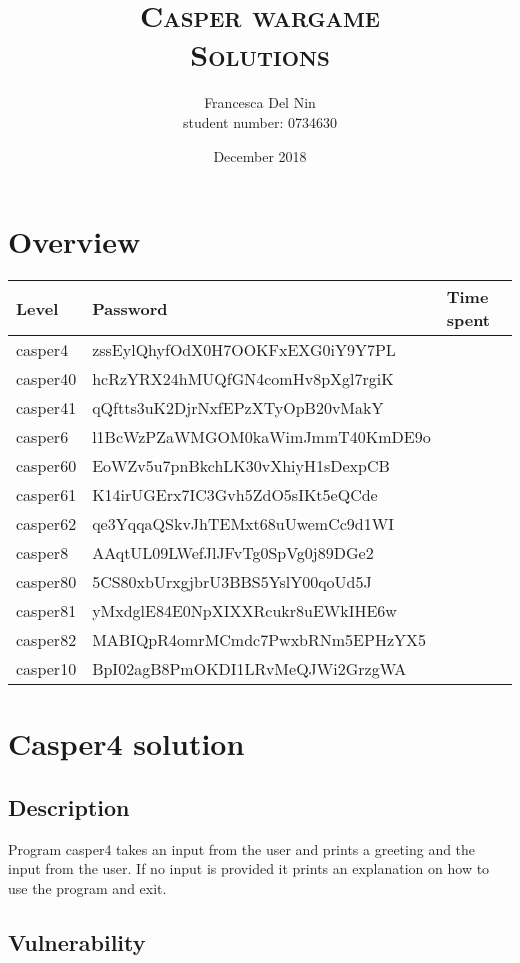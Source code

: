 \documentclass[a4paper,12pt]{article}
\title{\scshape Casper wargame \\ Solutions}
\author{Francesca Del Nin \\ student number: 0734630}
\date{December 2018}
\begin{document}
\maketitle


\section{Overview}
\begin{table}[]
\begin{tabular}{lll}
 Level & Password & Time spent  \\
 \hline
 casper4 & zssEylQhyfOdX0H7OOKFxEXG0iY9Y7PL &   \\
 casper40 & hcRzYRX24hMUQfGN4comHv8pXgl7rgiK & \\
 casper41 & qQftts3uK2DjrNxfEPzXTyOpB20vMakY &   \\
 casper6 & l1BcWzPZaWMGOM0kaWimJmmT40KmDE9o &  \\
 casper60 & EoWZv5u7pnBkchLK30vXhiyH1sDexpCB & \\
 casper61 & K14irUGErx7IC3Gvh5ZdO5sIKt5eQCde & \\
 casper62 & qe3YqqaQSkvJhTEMxt68uUwemCc9d1WI & \\

 casper8 & AAqtUL09LWefJlJFvTg0SpVg0j89DGe2 & \\
 casper80 & 5CS80xbUrxgjbrU3BBS5YslY00qoUd5J & \\
 casper81 & yMxdglE84E0NpXIXXRcukr8uEWkIHE6w & \\
 casper82 & MABIQpR4omrMCmdc7PwxbRNm5EPHzYX5 & \\
 casper10 & BpI02agB8PmOKDI1LRvMeQJWi2GrzgWA &\\
\end{tabular}
\end{table}

\newpage
\section{Casper4 solution}
\subsection{Description}
Program casper4 takes an input from the user and prints a greeting and the input from the user. If no input is provided it prints an explanation on how to use the program and exit.
 

\subsection{Vulnerability}
\end{document}
